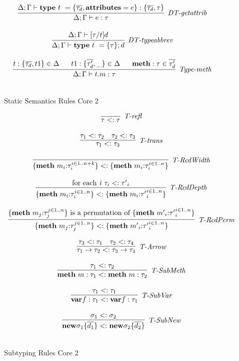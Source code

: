 \begin{figure}
\[\begin{array}{c}
\infer[\textit{DT-getattrib}]
        {\Delta; \Gamma \vdash e:\tau   }
	{\Delta; \Gamma \vdash  \keyw{type}~ t~=\{\overline{\tau_d}, \keyw{attributes}=e\} : \{\overline{\tau_d},\tau\}} \\[3ex]
	

\infer[\textit{DT-typeabbrev}]
	{\Delta; \Gamma \vdash  \keyw{type}~ t~=\{\tau\}; d} 
	{\Delta; \Gamma \vdash [\tau/t]d }\\[3ex]


\infer[\textit{Type-meth}]
	{\Delta; \Gamma \vdash  t.m:\tau} 
	{t : \{\overline{\tau_d}, t1\} \in \Delta ~~~~~ t1 : \{\overline{\tau'_d},\_\} \in \Delta ~~~~~ \keyw{meth}:\tau \in \overline{\tau'_d}   }\\[3ex]
	

\end{array}
\]
\caption{Static Semantics Rules Core 2}
\end{figure}

\begin{figure}
\centering
\[
\begin{array}{c}
\infer[\textit{T-refl}]
	{\tau<:\tau}
	{} \\[3ex]

\infer[\textit{T-trans}]
	{\tau_1<:\tau_3}
	{\tau_1<:\tau_2 & \tau_2<:\tau_3} \\[3ex]	

\infer[\textit{T-RcdWidth}]
	{\{ \keyw{meth}~m_i{:}\tau_i ^{i \in 1..n+k} \} <: \{\keyw{meth}~m_i{:}\tau_i ^{i \in 1..n} \}}
	{}\\[3ex]

\infer[\textit{T-RcdDepth}]
	{\{ \keyw{meth}~m_i{:}\tau_i ^{i \in 1..n} \} <: \{ \keyw{meth}~m_i{:}{\tau'}_i ^{i \in 1..n} \}}
	{\textrm{for each \textit{i}} ~ \tau_i <: {\tau'}_i}\\[3ex]

\infer[\textit{T-RcdPerm}]
	{\{ \keyw{meth}~m_j{:}\tau_j ^{j \in 1..n} \} <: \{ \keyw{meth}~{m'}_i{:}{\tau'}_i ^{i \in 1..n} \}}
	{\{ \keyw{meth}~m_j{:}\tau_j ^{j \in 1..n} \} \textrm{ is a permutation of } \{ \keyw{meth}~{m'}_i{:}{\tau'}_i ^{i \in 1..n} \}}\\[3ex]

\infer[\textit{T-Arrow}]
	{\tau_1 \rightarrow \tau_2 <: \tau_3 \rightarrow \tau_4}
	{\tau_3 <: \tau_1 & \tau_2 <: \tau_4}\\[3ex]

\infer[\textit{T-SubMeth}]
	{\keyw{meth}~m:\tau_1 <: \keyw{meth}~ m:\tau_2}
	{\tau_1 <: \tau_2}\\[3ex]

\infer[\textit{T-SubVar}]
	{\keyw{var} f:\tau_1 <: \keyw{var} f:\tau_1}
	{\tau_1 <: \tau_1}\\[3ex]

\infer[\textit{T-SubNew}]
	{\keyw{new} \sigma_1\{\overline{d_1}\} <: \keyw{new} \sigma_2\{\overline{d_2}\}}
	{\sigma_1 <: \sigma_2}\\[3ex]

\end{array}
\]
\caption{Subtyping Rules Core 2}
\end{figure}



